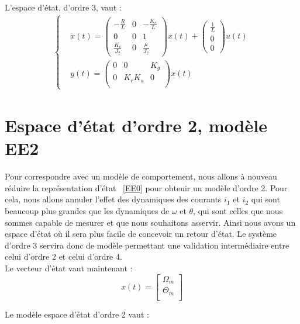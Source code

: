 \noindent L'espace d'état, d'ordre 3, vaut : 
\begin{align}
\label{EE0}
\left\lbrace
\begin{aligned}
&\dot{x}(t) = \begin{pmatrix}
-\frac{R}{L}	& 	     0 &   -\frac{K_e}{L}	\\
0&	0 & 1\\
\frac{K_c}{J_2}	&	0&	\frac{\mu}{J_2}
\end{pmatrix}x(t)+\begin{pmatrix}
\frac{1}{L}\\0\\0
\end{pmatrix}u(t)\\
&y(t) = \begin{pmatrix}
0&		0 & K_g	\\
0&		K_rK_s	&	0\\
\end{pmatrix}x(t)
\end{aligned}
\right.
\end{align}
\section{Espace d'état d'ordre 2, modèle EE2}
Pour correspondre avec un modèle de comportement, nous allons à nouveau réduire la représentation d'état ~\eqref{EE0} pour obtenir un modèle d'ordre 2. Pour cela, nous allons annuler l'effet des dynamiques des courants $i_1$ et $i_2$ qui sont beaucoup plus grandes que les dynamiques de $\omega$ et $\theta$, qui sont celles que nous sommes capable de mesurer et que nous souhaitons asservir. Ainsi nous avons un espace d'état o\`u il sera plus facile de concevoir un retour d'état. Le système d'ordre 3 servira donc de modèle permettant une validation intermédiaire entre celui d'ordre 2 et celui d'ordre 4.\\

\noindent Le vecteur d'état vaut maintenant : \begin{equation}
x(t)=\begin{bmatrix}
\Omega_m\\
\Theta_m\\
\end{bmatrix}
\end{equation}

\noindent Le modèle espace d'état d'ordre 2 vaut :\\

